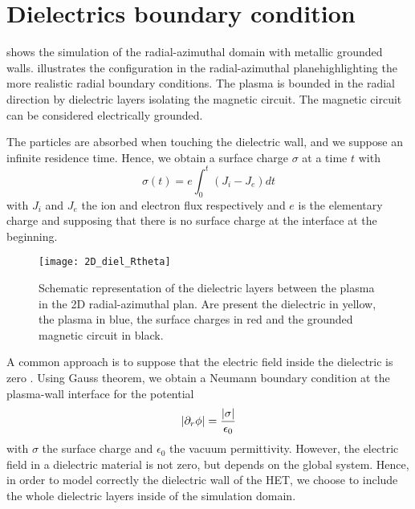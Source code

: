
\section{Dielectrics boundary condition}
  \label{sec-diel}

   shows the simulation of the radial-azimuthal domain with metallic grounded walls.
   illustrates the configuration in the radial-azimuthal planehighlighting the more realistic radial boundary conditions.
  The plasma is bounded in the radial direction by dielectric layers isolating the magnetic circuit.
  The magnetic circuit can be considered electrically grounded.

  The particles are absorbed when touching the dielectric wall, and we suppose an infinite residence time.
  Hence, we obtain a surface charge $\sigma$ at a time $t$ with
  \begin{equation} \label{eq-sigmaintegrate}
    \sigma(t) = e \int_0^t (J_i - J_e) dt
  \end{equation}
  with $J_i$ and $J_e$ the ion and electron flux respectively and $e$ is the elementary charge and supposing that there is no surface charge at the interface at the beginning.

  \begin{figure}[hbtp]
    \centering
    \texttt{[image: 2D\_diel\_Rtheta]}
    \caption{Schematic representation of the dielectric layers between the plasma in the \ac{2D} radial-azimuthal plan. Are present the dielectric in yellow, the plasma in blue, the surface charges in red and the grounded magnetic circuit in black.}
    \label{fig-2D}
  \end{figure}


  A common approach is to suppose that the electric field inside the dielectric is zero \citep{taccogna2019}. 
  Using Gauss theorem, we obtain a Neumann boundary condition at the plasma-wall interface for the potential
  \begin{equation} \label{eq-gauss}
    \lvert\partial_r \phi\rvert = \frac{\lvert\sigma\rvert}{\epsilon_0}
  \end{equation}
  with $\sigma$ the surface charge and $\epsilon_0$ the vacuum permittivity.
  However, the electric field in a dielectric material is not zero, but depends on the global system.
  Hence, in order to model correctly the dielectric wall of the \ac{HET}, we choose to include the whole dielectric layers inside of the simulation domain.

